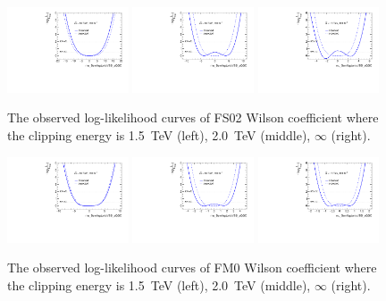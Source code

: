\begin{figure}[ht]
    \centering
    \includegraphics[width=0.32\textwidth]{figures/aQGC/profileFS021500}
    	\includegraphics[width=0.32\textwidth]{figures/aQGC/profileFS022000}
        \includegraphics[width=0.32\textwidth]{figures/aQGC/profileFS02inf}
        \caption{The observed log-likelihood curves of FS02 Wilson coefficient where the clipping energy is 1.5~TeV (left), 2.0~TeV (middle), $\infty$ (right).}
        \label{fig:ProfileLLFS}
\end{figure}
\begin{figure}[ht]
    \centering
    \includegraphics[width=0.32\textwidth]{figures/aQGC/profileFM01500}
    	\includegraphics[width=0.32\textwidth]{figures/aQGC/profileFM02000}
        \includegraphics[width=0.32\textwidth]{figures/aQGC/profileFM0inf}
        \caption{The observed log-likelihood curves of FM0 Wilson coefficient where the clipping energy is 1.5~TeV (left), 2.0~TeV (middle), $\infty$ (right).}
        \label{fig:ProfileLLFM}
\end{figure}
